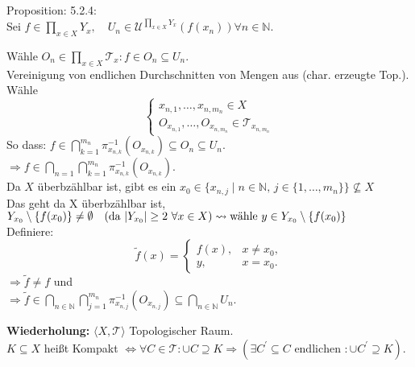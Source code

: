 \begin{myproof}{Proposition: 5.2.4:}\\
    Sei $f \in \prod_{x \in X} Y_x, \quad U_n \in \mathcal{U}^{\prod_{x \in X}Y_x}
    (f(x_n)) \forall n \in \mathbb{N}$.

    Wähle $  O_n \in \prod_{x \in X} \mathcal{T}_x : f \in O_n \subseteq U_n.$ \\
Vereinigung von endlichen Durchschnitten von Mengen aus (char. erzeugte Top.). \\
Wähle 
$$ 
\begin{cases}
x_{n,1}, \ldots, x_{n,m_n} \in X \\
O_{x_{n,1}}, \ldots, O_{x_{n,m_n}} \in \mathcal{T}_{x_{n,m_n}}
\end{cases}
$$
So dass: $f \in \bigcap_{k=1}^{m_n} \pi_{x_{n,k}}^{-1}(O_{x_{n,k}}) \subseteq O_n \subseteq U_n.$\\
$\Rightarrow f \in \bigcap_{n=1} \bigcap_{k=1}^{m_n} \pi_{x_{n,k}}^{-1}(O_{x_{n,k}}).$\\
Da $X$ überbzählbar ist, gibt es ein $x_0 \in \{x_{n,j} \mid n \in \mathbb{N},\, j \in \{1, \ldots, m_n\}\} \not\subseteq X$ \\
Das geht da X überbzählbar ist,
$Y_{x_0} \setminus \{f(x_0)\} \neq \emptyset
  \quad (\text{da } |Y_{x_0}| \ge 2 \ \forall x \in X) \\
  \rightsquigarrow \text{wähle } y \in Y_{x_0} \setminus \{f(x_0)\}$\\
Definiere:
$$
\tilde{f}(x) = 
  \begin{cases}
    f(x), & x \ne x_0, \\
    y, & x = x_0.
  \end{cases}
$$
$\Rightarrow \tilde{f} \neq f$ und\\
$\Rightarrow \tilde{f} \in \bigcap_{n\in \mathbb{N}}
\bigcap_{j=1}^{m_n} \pi_{x_{n,j}}^{-1}(O_{x_{n,j}}) \subseteq
\bigcap_{n \in \mathbb{N}} U_n.$\\
\end{myproof}

\nt
{
    \textbf{Wiederholung:} $\langle X, \mathcal{T} \rangle$ Topologischer Raum.\\
    $K \subseteq X$ heißt Kompakt 
    $\Leftrightarrow \forall C \in \mathcal{T} : \cup C \supseteq K 
    \Rightarrow (\exists C^{'} \subseteq C \text{ endlichen } : \cup C^{'} \supseteq K)$.
}

